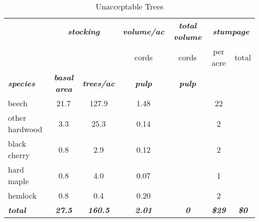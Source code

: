 \documentclass[landscape]{article}
\begin{document}
\begin{table}[H]

\caption{\label{tab:unnamed-chunk-22}Unacceptable Trees}
\fontsize{10}{12}\selectfont
\begin{tabular}[t]{lcccccc}
\toprule
\multicolumn{1}{c}{\em{\textbf{ }}} & \multicolumn{2}{c}{\em{\textbf{stocking}}} & \multicolumn{1}{c}{\em{\textbf{volume/ac }}} & \multicolumn{1}{c}{\em{\textbf{total volume}}} & \multicolumn{2}{c}{\em{\textbf{stumpage}}} \\
\cmidrule(l{3pt}r{3pt}){2-3} \cmidrule(l{3pt}r{3pt}){4-4} \cmidrule(l{3pt}r{3pt}){5-5} \cmidrule(l{3pt}r{3pt}){6-7}
\multicolumn{3}{c}{ } & \multicolumn{1}{c}{cords} & \multicolumn{1}{c}{cords} & \multicolumn{1}{c}{per acre} & \multicolumn{1}{c}{total} \\
\cmidrule(l{3pt}r{3pt}){4-4} \cmidrule(l{3pt}r{3pt}){5-5} \cmidrule(l{3pt}r{3pt}){6-6} \cmidrule(l{3pt}r{3pt}){7-7}
\rowcolor[HTML]{DCDCDC}  \em{\textbf{species}} & \em{\textbf{basal area}} & \em{\textbf{trees/ac}} & \em{\textbf{pulp}} & \em{\textbf{pulp}} & \em{\textbf{ }} & \em{\textbf{ }}\\
\midrule
\rowcolor{gray!6}  beech & 21.7 & 127.9 & 1.48 &  & 22 & \\
 
other hardwood & 3.3 & 25.3 & 0.14 &  & 2 & \\
 
\rowcolor{gray!6}  black cherry & 0.8 & 2.9 & 0.12 &  & 2 & \\
 
hard maple & 0.8 & 4.0 & 0.07 &  & 1 & \\
 
\rowcolor{gray!6}  hemlock & 0.8 & 0.4 & 0.20 &  & 2 & \\
 
\rowcolor[HTML]{DCDCDC}  \em{\textbf{total}} & \em{\textbf{27.5}} & \em{\textbf{160.5}} & \em{\textbf{2.01}} & \em{\textbf{0}} & \em{\textbf{\$29}} & \em{\textbf{\$0}}\\
\bottomrule
\end{tabular}
\end{table}
\end{document}
